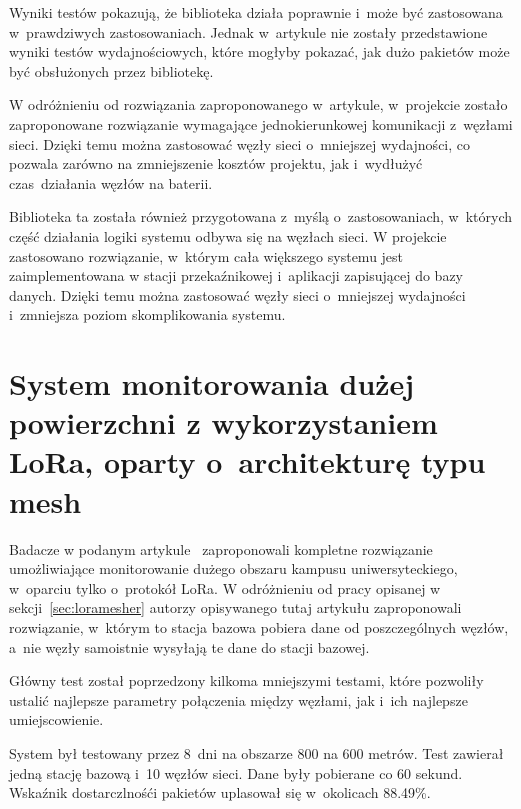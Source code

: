 Wyniki testów pokazują, że biblioteka działa poprawnie i~może być zastosowana w~prawdziwych zastosowaniach.
Jednak w~artykule nie zostały przedstawione wyniki testów wydajnościowych, które mogłyby pokazać, jak dużo pakietów może być obsłużonych przez bibliotekę.

W odróżnieniu od rozwiązania zaproponowanego w~artykule, w~projekcie zostało zaproponowane rozwiązanie wymagające jednokierunkowej komunikacji z~węzłami sieci.
Dzięki temu można zastosować węzły sieci o~mniejszej wydajności, co pozwala zarówno na zmniejszenie kosztów projektu, jak i~wydłużyć czas~działania węzłów na baterii.

Biblioteka ta została również przygotowana z~myślą o~zastosowaniach, w~których część działania logiki systemu odbywa się na węzłach sieci.
W projekcie zastosowano rozwiązanie, w~którym cała większego systemu jest zaimplementowana w stacji przekaźnikowej i~aplikacji zapisującej do bazy danych.
Dzięki temu można zastosować węzły sieci o~mniejszej wydajności i~zmniejsza poziom skomplikowania systemu.

\section{System monitorowania dużej powierzchni z wykorzystaniem LoRa, oparty o~architekturę typu mesh}

Badacze w podanym artykule~\cite{bib:loramesh-lee} zaproponowali kompletne rozwiązanie umożliwiające monitorowanie dużego obszaru kampusu uniwersyteckiego, w~oparciu tylko o~protokół LoRa.
W odróżnieniu od pracy opisanej w sekcji~\ref{sec:loramesher} autorzy opisywanego tutaj artykułu zaproponowali rozwiązanie, w~którym to stacja bazowa pobiera dane od poszczególnych węzłów, a~nie węzły samoistnie wysyłają te dane do stacji bazowej.

Główny test został poprzedzony kilkoma mniejszymi testami, które pozwoliły ustalić najlepsze parametry połączenia między węzłami, jak i~ich najlepsze umiejscowienie.

System był testowany przez 8~dni na obszarze 800 na 600 metrów.
Test zawierał jedną stację bazową i~10 węzłów sieci.
Dane były pobierane co 60 sekund.
Wskaźnik dostarczlnośći pakietów uplasował się w~okolicach 88.49\%.

